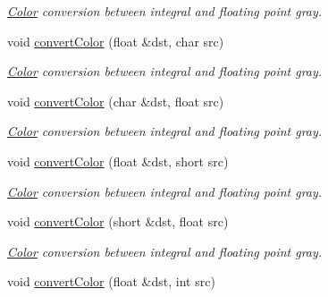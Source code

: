 \begin{DoxyCompactItemize}
\begin{DoxyCompactList}\small\item\em \hyperlink{class_d_o_1_1_color}{Color} conversion between integral and floating point gray. \end{DoxyCompactList}\item 
\hypertarget{group___color_conversion_gae6e303ccb39b66575d4dca9e3cf7f125}{void \hyperlink{group___color_conversion_gae6e303ccb39b66575d4dca9e3cf7f125}{convert\-Color} (float \&dst, char src)}\label{group___color_conversion_gae6e303ccb39b66575d4dca9e3cf7f125}

\begin{DoxyCompactList}\small\item\em \hyperlink{class_d_o_1_1_color}{Color} conversion between integral and floating point gray. \end{DoxyCompactList}\item 
\hypertarget{group___color_conversion_ga771ff14c748a8b73de71819dadb4d33e}{void \hyperlink{group___color_conversion_ga771ff14c748a8b73de71819dadb4d33e}{convert\-Color} (char \&dst, float src)}\label{group___color_conversion_ga771ff14c748a8b73de71819dadb4d33e}

\begin{DoxyCompactList}\small\item\em \hyperlink{class_d_o_1_1_color}{Color} conversion between integral and floating point gray. \end{DoxyCompactList}\item 
\hypertarget{group___color_conversion_gac0e2de0ed7e83cf04856e237f6562255}{void \hyperlink{group___color_conversion_gac0e2de0ed7e83cf04856e237f6562255}{convert\-Color} (float \&dst, short src)}\label{group___color_conversion_gac0e2de0ed7e83cf04856e237f6562255}

\begin{DoxyCompactList}\small\item\em \hyperlink{class_d_o_1_1_color}{Color} conversion between integral and floating point gray. \end{DoxyCompactList}\item 
\hypertarget{group___color_conversion_ga9db0741b322244e6857ed7cfd3360620}{void \hyperlink{group___color_conversion_ga9db0741b322244e6857ed7cfd3360620}{convert\-Color} (short \&dst, float src)}\label{group___color_conversion_ga9db0741b322244e6857ed7cfd3360620}

\begin{DoxyCompactList}\small\item\em \hyperlink{class_d_o_1_1_color}{Color} conversion between integral and floating point gray. \end{DoxyCompactList}\item 
\hypertarget{group___color_conversion_gacf105c01bcb8c0fb4fa40c42c61b34c5}{void \hyperlink{group___color_conversion_gacf105c01bcb8c0fb4fa40c42c61b34c5}{convert\-Color} (float \&dst, int src)}\label{group___color_conversion_gacf105c01bcb8c0fb4fa40c42c61b34c5}


\end{DoxyCompactItemize}
